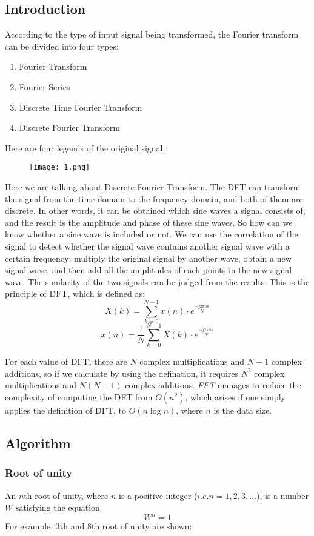 \documentclass[12pt,a4paper]{article}
\begin{document}
\subsection{Introduction}
According to the type of input signal being transformed, the Fourier transform can be divided into four types:
\begin{enumerate}
\item Fourier Transform
\item Fourier Series
\item Discrete Time Fourier Transform
\item Discrete Fourier Transform
\end{enumerate}
Here are four legends of the  original signal :
\newpage
\begin{figure}[h]
\begin{center}
\texttt{[image: 1.png]} 
\end{center}
\end{figure}
Here we are talking about Discrete Fourier Transform. The DFT can transform the signal from the time domain to the frequency domain, and both of them are discrete. In other words, it can be obtained which sine waves a signal consists of, and the result is the amplitude and phase of these sine waves. So how can we know whether a sine wave is included or not. We can use the correlation of the signal to detect whether the signal wave contains another signal wave with a certain frequency: multiply the original signal by another wave, obtain a new signal wave, and then add all the amplitudes of each points in the new signal wave. The similarity of the two signals can be judged from the results. This is the principle of DFT, which is defined as:
$$X(k)=\sum^{N-1}_{k=0} x(n)\cdot e^{\frac{-j2\pi nk}{N}}$$
$$x(n)=\dfrac{1}{N} \sum^{N-1}_{k=0} X(k)\cdot e^{\frac{-j2\pi nk}{N}}$$

For each value of DFT, there are $N$ complex multiplications and $N-1$ complex additions, so if we calculate by using the defination, it requires $N^2$ complex multiplications and $N(N-1)$
complex additions. \textit{FFT} manages to reduce the complexity of computing the DFT from $O(n^{2})$, which arises if one simply applies the definition of DFT, to $O(n\log n)$, where $n$ is the data size.
\subsection{Algorithm}
\subsubsection{Root of unity}
An $n$th root of unity, where $n$ is a positive integer ($i.e. n=1, 2, 3, \ldots$), is a number $W$ satisfying the equation $$W^{n}=1$$
For example, 3th and 8th root of unity are shown:
\end{document}
